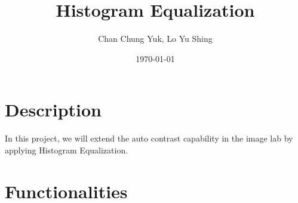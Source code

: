 \documentclass[a4paper]{article}
\title{Histogram Equalization}
\author{Chan Chung Yuk, Lo Yu Shing}
\date{\today}
\begin{document}
\maketitle

\section{Description}
In this project, we will extend the auto contrast capability in the image lab by applying Histogram Equalization. 

\section{Functionalities}
\end{document}

